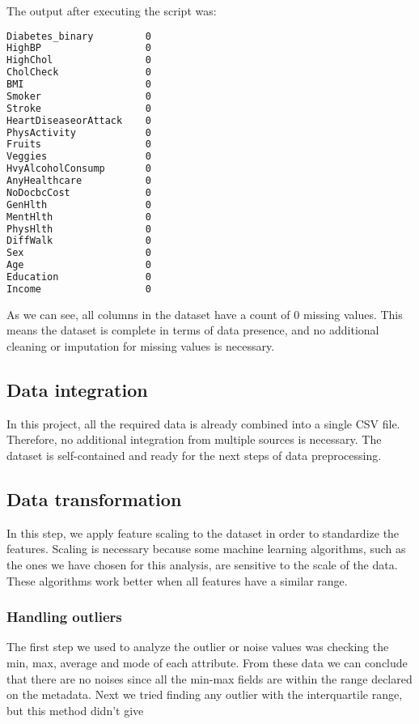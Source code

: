 The output after executing the script was:

\begin{lstlisting}[language=bash]
Diabetes_binary         0
HighBP                  0
HighChol                0
CholCheck               0
BMI                     0
Smoker                  0
Stroke                  0
HeartDiseaseorAttack    0
PhysActivity            0
Fruits                  0
Veggies                 0
HvyAlcoholConsump       0
AnyHealthcare           0
NoDocbcCost             0
GenHlth                 0
MentHlth                0
PhysHlth                0
DiffWalk                0
Sex                     0
Age                     0
Education               0
Income                  0
\end{lstlisting}

As we can see, all columns in the dataset have a count of 0 missing values. This means the dataset is complete in terms of data presence, and no additional cleaning or imputation for missing values is necessary.

\subsection{Data integration}
In this project, all the required data is already combined into a single CSV file. Therefore, no additional integration from multiple sources is necessary. The dataset is self-contained and ready for the next steps of data preprocessing.

\subsection{Data transformation}

In this step, we apply feature scaling to the dataset in order to standardize the features. Scaling is necessary because some machine learning algorithms, such as the ones we have chosen for this analysis, are sensitive to the scale of the data. These algorithms work better when all features have a similar range.

\subsubsection{Handling outliers}

The first step we used to analyze the outlier or noise values was checking the min, max, average and mode of each attribute. From these data we can conclude that there are no noises since all the min-max fields are within the range declared on the metadata.
\noindent Next we tried finding any outlier with the interquartile range, but this method didn't give

